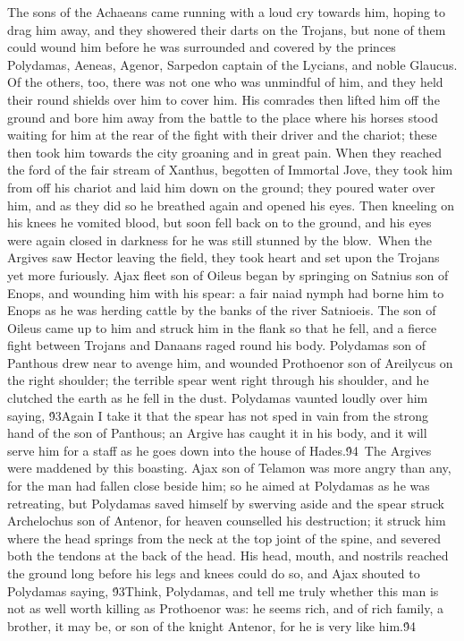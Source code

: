 {The sons of the Achaeans came running with a loud cry towards him, hoping to drag him away, and they showered their darts on the Trojans, but none of them could wound him before he was surrounded and covered by the princes Polydamas, Aeneas, Agenor, Sarpedon captain of the Lycians, and noble Glaucus. Of the others, too, there was not one who was unmindful of him, and they held their round shields over him to cover him. His comrades then lifted him off the ground and bore him away from the battle to the place where his horses stood waiting for him at the rear of the fight with their driver and the chariot; these then took him towards the city groaning and in great pain. When they reached the ford of the fair stream of Xanthus, begotten of Immortal Jove, they took him from off his chariot and laid him down on the ground; they poured water over him, and as they did so he breathed again and opened his eyes. Then kneeling on his knees he vomited blood, but soon fell back on to the ground, and his eyes were again closed in darkness for he was still stunned by the blow.\
When the Argives saw Hector leaving the field, they took heart and set upon the Trojans yet more furiously. Ajax fleet son of Oileus began by springing on Satnius son of Enops, and wounding him with his spear: a fair naiad nymph had borne him to Enops as he was herding cattle by the banks of the river Satnioeis. The son of Oileus came up to him and struck him in the flank so that he fell, and a fierce fight between Trojans and Danaans raged round his body. Polydamas son of Panthous drew near to avenge him, and wounded Prothoenor son of Areilycus on the right shoulder; the terrible spear went right through his shoulder, and he clutched the earth as he fell in the dust. Polydamas vaunted loudly over him saying, \'93Again I take it that the spear has not sped in vain from the strong hand of the son of Panthous; an Argive has caught it in his body, and it will serve him for a staff as he goes down into the house of Hades.\'94\
The Argives were maddened by this boasting. Ajax son of Telamon was more angry than any, for the man had fallen close beside him; so he aimed at Polydamas as he was retreating, but Polydamas saved himself by swerving aside and the spear struck Archelochus son of Antenor, for heaven counselled his destruction; it struck him where the head springs from the neck at the top joint of the spine, and severed both the tendons at the back of the head. His head, mouth, and nostrils reached the ground long before his legs and knees could do so, and Ajax shouted to Polydamas saying, \'93Think, Polydamas, and tell me truly whether this man is not as well worth killing as Prothoenor was: he seems rich, and of rich family, a brother, it may be, or son of the knight Antenor, for he is very like him.\'94\
}
